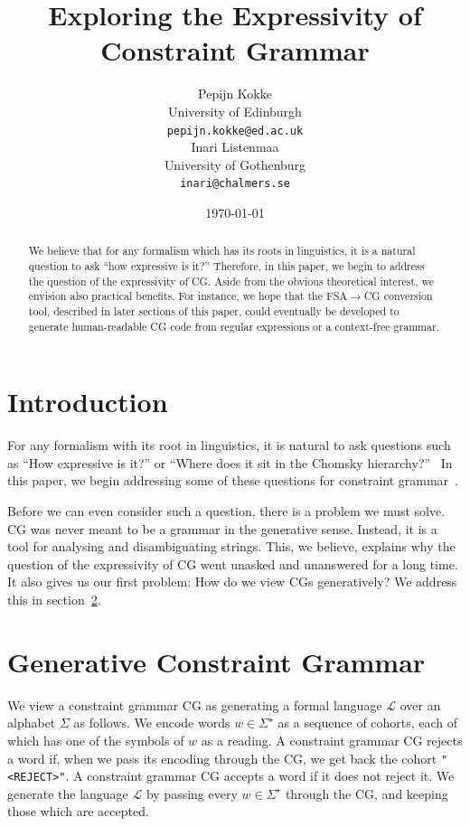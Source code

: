 \documentclass[11pt]{article}
\title{Exploring the Expressivity of Constraint Grammar}
\author{%
  Pepijn Kokke \\
  University of Edinburgh \\
  {\tt pepijn.kokke@ed.ac.uk} \\\And
  Inari Listenmaa \\
  University of Gothenburg \\
  {\tt inari@chalmers.se} }
\date{\today}
\def\t#1{\texttt{#1}}
\begin{document}
\maketitle

\begin{abstract}
  We believe that for any formalism which has its roots in linguistics, it is a
  natural question to ask ``how expressive is it?'' Therefore, in this paper, we
  begin to address the question of the expressivity of CG.
  Aside from the obvious theoretical interest, we envision also practical
  benefits. For instance, we hope that the FSA$\rightarrow$CG conversion tool, described in
  later sections of this paper, could eventually be developed to generate
  human-readable CG code from regular expressions or a context-free grammar. 
\end{abstract}


\section{Introduction}
For any formalism with its root in linguistics, it is natural to ask questions
such as ``How expressive is it?'' or ``Where does it sit in the Chomsky
hierarchy?''~\cite{chomsky1956hierarchy}
In this paper, we begin addressing some of these questions for constraint
grammar~\cite[CG]{karlsson1995constraint}.

Before we can even consider such a question, there is a problem we must
solve. CG was never meant to be a grammar in the generative sense. Instead, it
is a tool for analysing and disambiguating strings.
This, we believe, explains why the question of the expressivity of CG went
unasked and unanswered for a long time.
It also gives us our first problem: How do we view CGs generatively?
We address this in section~\ref{sec:gencg}.


\section{Generative Constraint Grammar}\label{sec:gencg}
We view a constraint grammar CG as generating a formal language $\mathcal{L}$
over an alphabet $\Sigma$ as follows.
We encode words $w \in \Sigma^\star$ as a sequence of cohorts, each of which has
one of the symbols of $w$ as a reading.
A constraint grammar CG rejects a word if, when we pass its encoding through the
CG, we get back the cohort \t{"<REJECT>"}. A constraint grammar CG accepts a word
if it does not reject it.
We generate the language $\mathcal{L}$ by passing every $w \in \Sigma^\star$
through the CG, and keeping those which are accepted.
\end{document}
